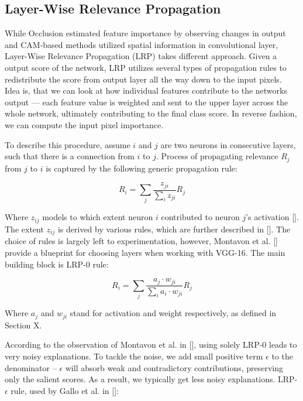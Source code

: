 \subsection{Layer-Wise Relevance Propagation}

While Occlusion estimated feature importance by observing changes in output and CAM-based methods utilized spatial information in convolutional layer, Layer-Wise Relevance Propagation (LRP) takes different approach. Given a output score of the network, LRP utilizes several types of propagation rules to redistribute the score from output layer all the way down to the input pixels. Idea is, that we can look at how individual features contribute to the networks output --- each feature value is weighted and sent to the upper layer across the whole network, ultimately contributing to the final class score. In reverse fashion, we can compute the input pixel importance.

To describe this procedure, assume $i$ and $j$ are two neurons in consecutive layers, such that there is a connection from $i$ to $j$. Process of propagating relevance $R_j$ from $j$ to $i$ is captured by the following generic propagation rule:

\begin{equation}
    R_i = \sum_j \frac{z_{ji}}{\sum_i z_{ji}} R_j
\end{equation}

Where $z_{ij}$ models to which extent neuron $i$ contributed to neuron $j$'s activation []. The extent $z_{ij}$ is derived by various rules, which are further described in []. The choice of rules is largely left to experimentation, however, Montavon et al. [] provide a blueprint for choosing layers when working with VGG-16. The main building block is LRP-$0$ rule:

\begin{equation}
    R_i = \sum_j \frac{a_j \cdot w_{ji}}{\sum_i a_i \cdot w_{ji}} R_j
\end{equation}

Where $a_j$ and $w_{ji}$ stand for activation and weight respectively, as defined in Section X.

According to the observation of Montavon et al. in [], using solely LRP-$0$ leads to very noisy explanations. To tackle the noise, we add small positive term $\epsilon$ to the denominator -- $\epsilon$ will absorb weak and contradictory contributions, preserving only the salient scores. As a result, we typically get less noisy explanations. LRP-$\epsilon$ rule, used by Gallo et al. in []:

